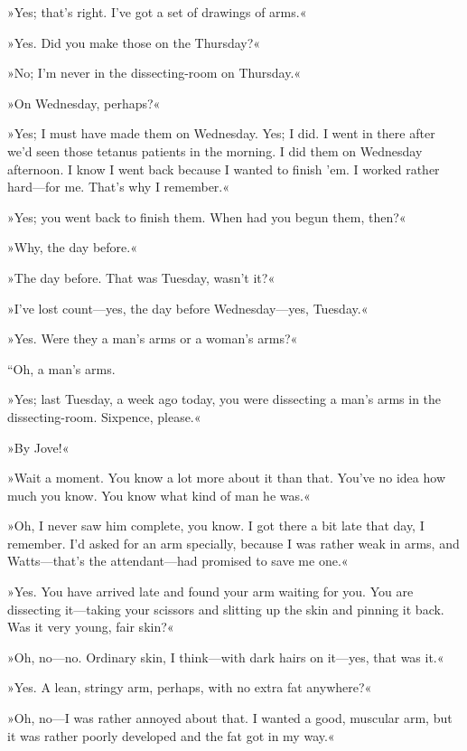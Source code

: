 »Yes; that's right. I've got a set of drawings of arms.«

»Yes. Did you make those on the Thursday?«

»No; I'm never in the dissecting-room on Thursday.«

»On Wednesday, perhaps?«

»Yes; I must have made them on Wednesday. Yes; I did. I went in there after we'd seen those tetanus patients in the morning. I did them on Wednesday afternoon. I know I went back because I wanted to finish 'em. I worked rather hard\allowbreak---\allowbreak for me. That's why I remember.«

»Yes; you went back to finish them. When had you begun them, then?«

»Why, the day before.«

»The day before. That was Tuesday, wasn't it?«

»I've lost count\allowbreak---\allowbreak yes, the day before Wednesday\allowbreak---\allowbreak yes, Tuesday.«

»Yes. Were they a man's arms or a woman's arms?«

“Oh, a man's arms.

»Yes; last Tuesday, a week ago today, you were dissecting a man's arms in the dissecting-room. Sixpence, please.«

»By Jove!«

»Wait a moment. You know a lot more about it than that. You've no idea how much you know. You know what kind of man he was.«

»Oh, I never saw him complete, you know. I got there a bit late that day, I remember. I'd asked for an arm specially, because I was rather weak in arms, and Watts\allowbreak---\allowbreak that's the attendant\allowbreak---\allowbreak had promised to save me one.«

»Yes. You have arrived late and found your arm waiting for you. You are dissecting it\allowbreak---\allowbreak taking your scissors and slitting up the skin and pinning it back. Was it very young, fair skin?«

»Oh, no\allowbreak---\allowbreak no. Ordinary skin, I think\allowbreak---\allowbreak with dark hairs on it\allowbreak---\allowbreak yes, that was it.«

»Yes. A lean, stringy arm, perhaps, with no extra fat anywhere?«

»Oh, no\allowbreak---\allowbreak I was rather annoyed about that. I wanted a good, muscular arm, but it was rather poorly developed and the fat got in my way.«

